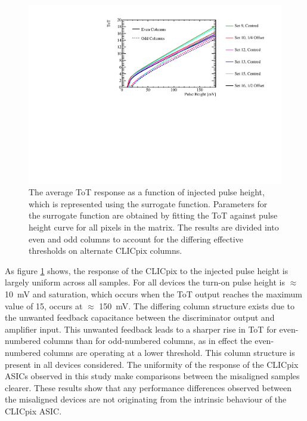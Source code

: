 \begin{figure}[h!]
\centering
\includegraphics[width=1.0\textwidth]{CLICdpVertex/Plots/TestPulseCalibration/FitParam/AverageToT_vs_InjectedPulseHeight.pdf}
\caption[The average ToT response as a function of injected pulse height, which is represented using the surrogate function.  Parameters for the surrogate function are obtained by fitting the ToT against pulse height curve for all pixels in the matrix.  The results are divided into even and odd columns to account for the differing effective thresholds on alternate CLICpix columns.]{The average ToT response as a function of injected pulse height, which is represented using the surrogate function.  Parameters for the surrogate function are obtained by fitting the ToT against pulse height curve for all pixels in the matrix.  The results are divided into even and odd columns to account for the differing effective thresholds on alternate CLICpix columns.}
\label{fig:testpulsemeanfit}
\end{figure}

As figure \ref{fig:testpulsemeanfit} shows, the response of the CLICpix to the injected pulse height is largely uniform across all samples.  For all devices the turn-on pulse height is $\approx$ 10~mV and saturation, which occurs when the ToT output reaches the maximum value of 15, occurs at $\approx$ 150~mV.  The differing column structure exists due to the unwanted feedback capacitance between the discriminator output and amplifier input.  This unwanted feedback leads to a sharper rise in ToT for even-numbered columns than for odd-numbered columns, as in effect the even-numbered columns are operating at a lower threshold.  This column structure is present in all devices considered.  The uniformity of the response of the CLICpix ASICs observed in this study make comparisons between the misaligned samples clearer.  These results show that any performance differences observed between the misaligned devices are not originating from the intrinsic behaviour of the CLICpix ASIC.   

